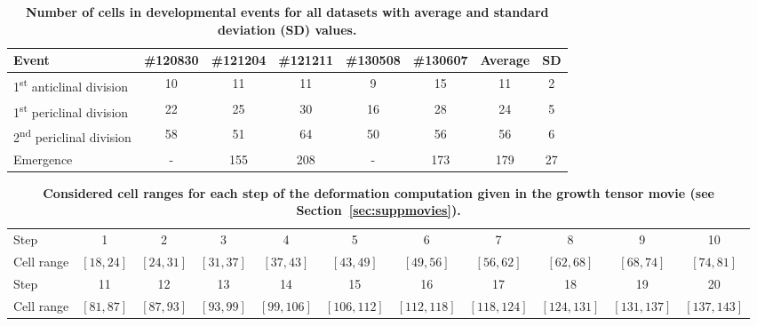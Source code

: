\documentclass[11pt,a4paper, final]{article}
\begin{document}
\clearpage
%
\renewcommand{\arraystretch}{1.1}
%
\begin{table}
	\begin{center}
		\begin{tabular}[h]{@{}lccccccc@{}}
		\toprule
		Event & \#120830 & \#121204 & \#121211 & \#130508 & \#130607 & Average & SD\\
		\midrule
		1\textsuperscript{st} anticlinal division & 10 & 11 & 11 & 9 & 15 & 11 & 2\\
		1\textsuperscript{st} periclinal division & 22 & 25 & 30 & 16 & 28 & 24 & 5\\
		2\textsuperscript{nd} periclinal division & 58 & 51 & 64 & 50 & 56 & 56 & 6\\
		Emergence & - & 155 & 208 & - & 173 & 179 & 27\\
		\bottomrule
		\end{tabular}
	\end{center}
	\caption[Number of cells in developmental events for all datasets.]{\textbf{Number of cells in developmental events for all datasets with average and standard deviation (SD) values.}
	}
	\label{tab:developmentalStages}
\end{table}
%
\setlength{\tabcolsep}{0.2em}
%
\begin{table}
\small
	\begin{center}
		\begin{tabular}[h]{@{}lcccccccccc@{}}
		\toprule
		Step & 1 & 2 & 3 & 4 & 5 & 6 & 7 & 8 & 9 & 10\\
		Cell range & $[18, 24]$ & $[24, 31]$ & $[31, 37]$ & $[37, 43]$ & $[43, 49]$ & $[49, 56]$ & $[56, 62]$ & $[62, 68]$ & $[68, 74]$ & $[74, 81]$\\
		\midrule
		Step & 11 & 12 & 13 & 14 & 15 & 16 & 17 & 18 & 19 & 20\\
		Cell range & $[81, 87]$ & $[87, 93]$ & $[93, 99]$ & $[99, 106]$ & $[106, 112]$ & $[112, 118]$ & $[118, 124]$ & $[124, 131]$ & $[131, 137]$ & $[137, 143]$\\
		\bottomrule
		\end{tabular}
	\end{center}
	\caption[Considered cell ranges for each step of the deformation computation.]{\textbf{Considered cell ranges for each step of the deformation computation given in the growth tensor movie (see Section~\ref{sec:suppmovies}).}
	}
	\label{tab:growthTensor}
\end{table}
\end{document}

